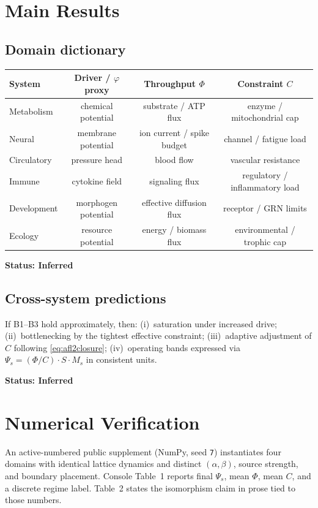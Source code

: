 \documentclass[11pt]{article}
\begin{document}
\section{Main Results}

\subsection{Domain dictionary}
\begin{center}
\begin{tabular}{@{}lccc@{}}
\toprule
\textbf{System} & \textbf{Driver / $\varphi$ proxy} & \textbf{Throughput $\Phi$} & \textbf{Constraint $C$} \\
\midrule
Metabolism & chemical potential & substrate / ATP flux & enzyme / mitochondrial cap \\
Neural & membrane potential & ion current / spike budget & channel / fatigue load \\
Circulatory & pressure head & blood flow & vascular resistance \\
Immune & cytokine field & signaling flux & regulatory / inflammatory load \\
Development & morphogen potential & effective diffusion flux & receptor / GRN limits \\
Ecology & resource potential & energy / biomass flux & environmental / trophic cap \\
\bottomrule
\end{tabular}
\end{center}

\textbf{Status: Inferred}

\subsection{Cross-system predictions}
If B1--B3 hold approximately, then: (i)~saturation under increased drive; (ii)~bottlenecking by the tightest effective constraint; (iii)~adaptive adjustment of $C$ following \eqref{eq:afl2closure}; (iv)~operating bands expressed via $\Psi_s=(\Phi/C) \cdot S \cdot M_s$ in consistent units.

\textbf{Status: Inferred}

\section{Numerical Verification}
An active-numbered public supplement (NumPy, seed \texttt{7}) instantiates four domains with identical lattice dynamics and distinct $(\alpha,\beta)$, source strength, and boundary placement. Console Table~1 reports final $\Psi_s$, mean $\Phi$, mean $C$, and a discrete regime label. Table~2 states the isomorphism claim in prose tied to those numbers.
\end{document}
